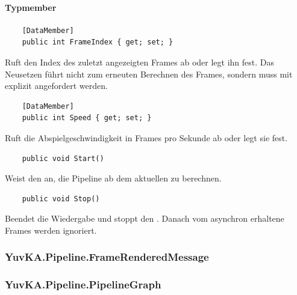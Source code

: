 \paragraph{Typmember}
\begin{itemize}

	\begin{verbatim}
	[DataMember]
	public int FrameIndex { get; set; }
	\end{verbatim}
	Ruft den Index des zuletzt angezeigten Frames ab oder legt ihn fest. Das Neusetzen führt nicht zum erneuten Berechnen des Frames, sondern muss mit  explizit angefordert werden.

	\begin{verbatim}
	[DataMember]
	public int Speed { get; set; }
	\end{verbatim}
	Ruft die Abspielgeschwindigkeit in Frames pro Sekunde ab oder legt sie fest.

	\begin{verbatim}
	public void Start()
	\end{verbatim}
	Weist den  an, die Pipeline ab dem aktuellen  zu berechnen.

	\begin{verbatim}
	public void Stop()
	\end{verbatim}
	Beendet die Wiedergabe und stoppt den . Danach vom  asynchron erhaltene Frames werden ignoriert.
\end{itemize}

\subsubsection{YuvKA.Pipeline.FrameRenderedMessage}

\subsubsection{YuvKA.Pipeline.PipelineGraph}
